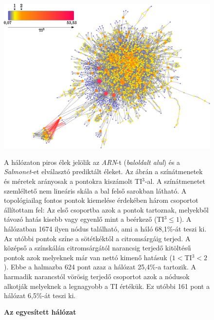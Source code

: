 \documentclass[a4paper,12pt]{article}
\newenvironment{imgdesc}{
		\small
		\singlespacing
		\begin{center}
		
	}{
		\end{center}	
	}
\begin{document}
					\begin{figure}[H]
						\includegraphics[scale=0.6]{img/merged.pdf}
						\centering
						\caption{\textbf{ Az egyesített hálózat}}
						\begin{imgdesc}
							A hálózaton piros élek jelölik az \textit{ARN}-t (\textit{baloldalt alul}) és a \textit{Salmonet}-et elválasztó prediktált éleket. Az ábrán a színátmenetek és méretek arányosak a pontokra kiszámolt TI$^3$-al. A színátmenetet szemléltető nem lineáris skála a bal felső sarokban látható. A topológiailag fontos pontok kiemelése érdekében három csoportot állítottam fel: Az első csoportba azok a pontok tartoznak, melyekből távozó hatás kisebb vagy egyenlő mint a beérkező (TI$^3\leq1$). A hálózatban 1674 ilyen nódus található, ami a háló 68,1\%-át teszi ki. Az utóbbi pontok színe a sötétkéktől a citromsárgáig terjed. A középső a színskálán citromsárgától narancsig terjedő kitöltésű pontok azok melyeknek már van nettó kimenő hatásuk ($1<$TI$^3<2$). Ebbe a halmazba 624 pont azaz a hálózat 25,4\%-a tartozik. A harmadik narancstól vörösig terjedő csoportot azok a nódusok alkotják melyeknek a legnagyobb a TI értékük. Ez utóbbi 161 pont a hálózat 6,5\%-át teszi ki.
						\end{imgdesc}
			
						\label{fig:merged}			 		 
					\end{figure}		
					
\end{document}
